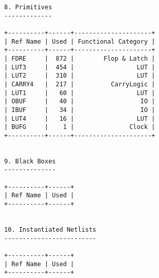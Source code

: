 \begin{Verbatim}[fontsize=\footnotesize,xleftmargin=-1cm]
8. Primitives
-------------

+----------+------+---------------------+
| Ref Name | Used | Functional Category |
+----------+------+---------------------+
| FDRE     |  872 |        Flop & Latch |
| LUT3     |  454 |                 LUT |
| LUT2     |  310 |                 LUT |
| CARRY4   |  217 |          CarryLogic |
| LUT1     |   60 |                 LUT |
| OBUF     |   40 |                  IO |
| IBUF     |   34 |                  IO |
| LUT4     |   16 |                 LUT |
| BUFG     |    1 |               Clock |
+----------+------+---------------------+


9. Black Boxes
--------------

+----------+------+
| Ref Name | Used |
+----------+------+


10. Instantiated Netlists
-------------------------

+----------+------+
| Ref Name | Used |
+----------+------+
\end{Verbatim}
